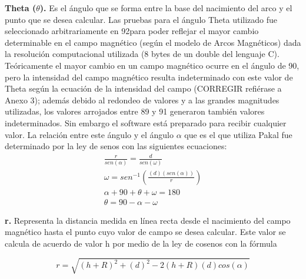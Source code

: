 \documentclass[9pt]{book}
\begin{document}
\textbf{Theta ($\theta$). }Es el \'angulo que se forma entre la base del nacimiento del arco y el punto que se desea calcular. Las pruebas para el \'angulo Theta utilizado fue seleccionado arbitrariamente en 92\degree para poder reflejar el mayor cambio determinable en el campo magn\'etico (seg\'un el modelo de Arcos Magn\'eticos) dada la resoluci\'on computacional utilizada (8 bytes de un double del lenguaje C). Te\'oricamente el mayor cambio en un campo magn\'etico ocurre en el \'angulo de 90\degree, pero la intensidad del campo magn\'etico resulta indeterminado con este valor de Theta seg\'un la ecuaci\'on de la intensidad del campo (CORREGIR refi\'erase a Anexo 3); adem\'as debido al redondeo de valores y a las grandes magnitudes utilizadas, los valores arrojados entre 89 y 91 generaron tambi\'en valores indeterminados. Sin embargo el software est\'a preparado para recibir cualquier valor.\newline
La relaci\'on entre este \'angulo y el \'angulo $\alpha$ que es el que utiliza Pakal fue determinado por la ley de senos con las siguientes ecuaciones:
\begin{gather*} \label{theta_equation}
\frac{r}{sen(\alpha)} = \frac{d}{sen(\omega)} \\
\omega = sen^{-1}(\frac{(d)(sen(\alpha))}{r}) \\
\alpha + 90 + \theta + \omega = 180 \\
\theta = 90 - \alpha - \omega
\end{gather*}

\textbf{r. }Representa la distancia medida en l\'inea recta desde el nacimiento del campo magn\'etico hasta el punto cuyo valor de campo se desea calcular. Este valor se calcula de acuerdo de valor h por medio de la ley de cosenos con la f\'ormula
 
\begin{equation*} \label{r_equation}
r = \sqrt{ (h+R)^2 + (d)^2 - 2(h+R)(d)cos(\alpha)  }
\end{equation*}
\end{document}
